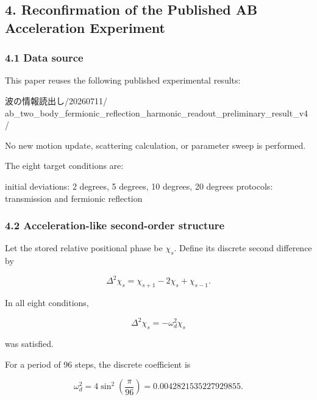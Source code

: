 \documentclass[
  a4paper,
]{article}
\newenvironment{Shaded}{}{}
\newcommand{\NormalTok}[1]{#1}
\begin{document}
\subsection{4. Reconfirmation of the Published AB Acceleration
Experiment}\label{reconfirmation-of-the-published-ab-acceleration-experiment}

\subsubsection{4.1 Data source}\label{data-source}

This paper reuses the following published experimental results:

\begin{Shaded}
\begin{Highlighting}[]
\NormalTok{波の情報読出し/20260711/}
\NormalTok{ab\_two\_body\_fermionic\_reflection\_harmonic\_readout\_preliminary\_result\_v4/}
\end{Highlighting}
\end{Shaded}

No new motion update, scattering calculation, or parameter sweep is
performed.

The eight target conditions are:

\begin{Shaded}
\begin{Highlighting}[]
\NormalTok{initial deviations: 2 degrees, 5 degrees, 10 degrees, 20 degrees}
\NormalTok{protocols: transmission and fermionic reflection}
\end{Highlighting}
\end{Shaded}

\subsubsection{4.2 Acceleration-like second-order
structure}\label{acceleration-like-second-order-structure}

Let the stored relative positional phase be \(\chi_s\). Define its
discrete second difference by

\[
\Delta^2\chi_s
=\chi_{s+1}-2\chi_s+\chi_{s-1}.
\]

In all eight conditions,

\[
\Delta^2\chi_s
=-\omega_d^2\chi_s
\]

was satisfied.

For a period of 96 steps, the discrete coefficient is

\[
\omega_d^2
=4\sin^2\left(\frac{\pi}{96}\right)
=0.0042821535227929855.
\]
\end{document}
